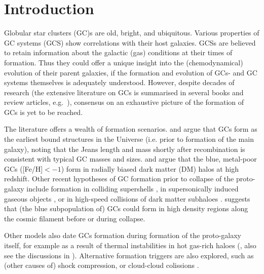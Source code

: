 \documentclass[a4paper,fleqn,usenatbib]{mnras}
\begin{document}
\section{Introduction}
Globular star clusters (GC)s are old, bright, and ubiquitous. Various properties of
GC systems (GCS) show correlations with their host galaxies. GCSs are believed to
retain information about the galactic (gas) conditions at their times of formation.
Thus they could offer a unique insight into the (chemodynamical) evolution of their 
parent galaxies, if the formation and evolution of GCs- and GC systems themselves 
is adequately understood. However, despite decades of research (the extensive 
literature on GCs is summarised in several books and review articles, e.g.~\citealt{
1991ARA&A..29..543H, Harris2001, 2004Natur.427...31W, 2006ARA&A..44..193B, 
2012A&ARv..20...50G, 2014CQGra..31x4006K, 2018RSPSA.47470616F}), consensus on an 
exhaustive picture of the formation of GCs is yet to be reached.

The literature offers a wealth of formation scenarios. \citet{1968ApJ...154..891P}
and \citet{1984ApJ...277..470P} argue that GCs form as the earliest bound
structures in the Universe (i.e. prior to formation of the main galaxy), 
noting that the Jeans length and mass shortly after recombination is consistent
with typical GC masses and sizes. \citet{2005MNRAS.364..367D} and \citet{
2009ApJ...706L.192B} argue that the blue, metal-poor GCs ([Fe/H]$ < -1$) form in 
radially biased dark matter (DM) halos at high redshift. Other recent hypotheses 
of GC formation prior to collapse of the proto-galaxy include formation in colliding 
supershells \citep{2017Ap&SS.362..183R}, in supersonically induced gaseous objects
\citep{2019arXiv190408941C}, or in high-speed collisions of dark matter subhaloes
\citep{2019arXiv190508951M}. \citet{2017MNRAS.472.3120B} suggests
that (the blue subpopulation of) GCs could form in high density regions along
the cosmic filament before or during collapse.

Other models also date GCs formation during formation of the proto-galaxy itself,
for example as a result of thermal instabilities in hot gas-rich haloes 
(\citealt{1985ApJ...298...18F}, also see the discussions in \citealt{
1990ApJ...363..488K}). Alternative formation triggers are also explored, such as 
(other causes of) shock compression, or cloud-cloud colissions \citep[e.g.][]{
1980glcl.conf..301G, 1992ApJ...400..265M, 1994ApJ...429..177H, 1995ApJ...442..618V,
1996ASPC...92..241L, 2001ApJ...560..592C}. 
\end{document}
